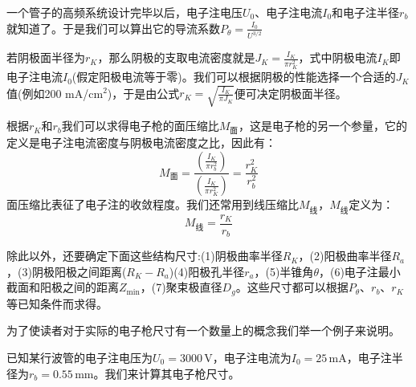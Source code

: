一个管子的高频系统设计完毕以后，电子注电压$ U_0 $、电子注电流$ I_0 $和电子注半径$ r_b $就知道了。于是我们可以算出它的导流系数$ P_\theta = \frac{I_0}{U^{3/2}} $

若阴极面半径为$ r_K $，那么阴极的支取电流密度就是$ J_K = \frac{I_K}{\pi r_K^2} $，式中阴极电流$ I_K$即电子注电流$ I_0 $(假定阳极电流等于零)。我们可以根据阴极的性能选择一个合适的$ J_K $值(例如200 mA/cm$ ^ 2$)，于是由公式$ r_K = \sqrt{\frac{I_K}{\pi J_K}} $便可决定阴极面半径。

根据$ r_K $和$ r_b $我们可以求得电子枪的面压缩比$ M_{\textrm{面}} $，这是电子枪的另一个参量，它的定义是电子注电流密度与阴极电流密度之比，因此有：
\begin{equation} \label{eq:ch6-2}
	M_{\textrm{面}} = \frac{\left(\frac{I_K}{\pi r_b^2}\right)}{\left(\frac{I_K}{\pi r_K^2}\right)} = \frac{r_K^2}{r_b^2}
\end{equation}
面压缩比表征了电子注的收敛程度。我们还常用到线压缩比$ M_{\textrm{线}} $，$ M_{\textrm{线}} $定义为：
\begin{equation} \label{eq:ch6-3}
	 M_{\textrm{线}}  = \frac{r_K}{r_b}
\end{equation}

除此以外，还要确定下面这些结构尺寸:(1)阴极曲率半径$ R_K $，(2)阳极曲率半径$ R_a $，(3)阴极阳极之间距离($ R_K-R_a $)(4)阳极孔半径$ r_a $，(5)半锥角$ \theta $，(6)电子注最小截面和阳极之间的距离$ Z_{\textrm{min}} $，(7)聚束极直径$ D_g $。这些尺寸都可以根据$ P_\theta $、$ r_b $、$ r_K $等已知条件而求得。

为了使读者对于实际的电子枪尺寸有一个数量上的概念我们举一个例子来说明。

已知某行波管的电子注电压为$ U_0 = 3000 $\,V，电子注电流为$ I_0 = 25 $\,mA，电子注半径为$ r_b = 0.55 $\,mm。我们来计算其电子枪尺寸。

